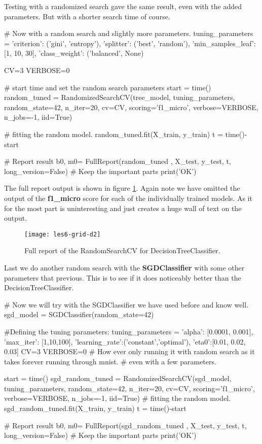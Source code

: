 \documentclass{article}
\begin{document}
\noindent
Testing with a randomized search gave the same result, even with the added parameters. 
But with a shorter search time of course.

\begin{pyminted}
# Now with a random search and slightly more parameters.
tuning_parameters = {
    'criterion': ('gini', 'entropy'),
    'splitter': ('best', 'random'),
    'min_samples_leaf': [1, 10, 30],
    'class_weight': ('balanced', None)
}

CV=3
VERBOSE=0

# start time and set the random search parameters
start = time()
random_tuned = RandomizedSearchCV(tree_model, tuning_parameters, random_state=42, n_iter=20, cv=CV,
    scoring='f1_micro', verbose=VERBOSE, n_jobs=-1, iid=True)

# fitting the random model.
random_tuned.fit(X_train, y_train)
t = time()-start

# Report result
b0, m0= FullReport(random_tuned , X_test, y_test, t, long_version=False) # Keep the important parts
print('OK')
\end{pyminted}

\noindent The full report output is shown in figure \ref{fig:les6-grid-d2}. Again note we have omitted the output of the \textbf{f1\_micro} score for each of the individually trained models. As it for the most part is uninteresting and just creates a huge wall of text on the output.
\begin{figure}[H]
  \centering
    \texttt{[image: les6-grid-d2]}
    \caption{Full report of the RandomSearchCV for DecisionTreeClassifier.}
    \label{fig:les6-grid-d2}
\end{figure}


\noindent
Last we do another random search with the \textbf{SGDClassifier} with some other parameters that previous. This is to see if it does noticeably better than the DecisionTreeClassifier.

\begin{pyminted}
# Now we will try with the SGDClassifier we have used before and know well.
sgd_model = SGDClassifier(random_state=42)

#Defining the tuning parameters:
tuning_parameters = {
    'alpha': [0.0001, 0.001],
    'max_iter': [1,10,100],
    'learning_rate':('constant','optimal'),
    'eta0':[0.01, 0.02, 0.03]
}
CV=3
VERBOSE=0
# How ever only running it with random search as it takes forever running through mnist.
# even with a few parameters.

start = time()
sgd_random_tuned = RandomizedSearchCV(sgd_model, tuning_parameters, random_state=42, n_iter=20, cv=CV,
    scoring='f1_micro', verbose=VERBOSE, n_jobs=-1, iid=True)
# fitting the random model.
sgd_random_tuned.fit(X_train, y_train)
t = time()-start

# Report result
b0, m0= FullReport(sgd_random_tuned , X_test, y_test, t, long_version=False) # Keep the important parts
print('OK')
\end{pyminted}
\end{document}
